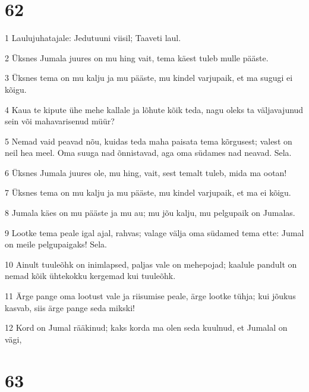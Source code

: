 \chapter{62}

\par 1 Laulujuhatajale: Jedutuuni viisil; Taaveti laul.
\par 2 Üksnes Jumala juures on mu hing vait, tema käest tuleb mulle pääste.
\par 3 Üksnes tema on mu kalju ja mu pääste, mu kindel varjupaik, et ma sugugi ei kõigu.
\par 4 Kaua te kipute ühe mehe kallale ja lõhute kõik teda, nagu oleks ta väljavajunud sein või mahavarisenud müür?
\par 5 Nemad vaid peavad nõu, kuidas teda maha paisata tema kõrgusest; valest on neil hea meel. Oma suuga nad õnnistavad, aga oma südames nad neavad. Sela.
\par 6 Üksnes Jumala juures ole, mu hing, vait, sest temalt tuleb, mida ma ootan!
\par 7 Üksnes tema on mu kalju ja mu pääste, mu kindel varjupaik, et ma ei kõigu.
\par 8 Jumala käes on mu pääste ja mu au; mu jõu kalju, mu pelgupaik on Jumalas.
\par 9 Lootke tema peale igal ajal, rahvas; valage välja oma südamed tema ette: Jumal on meile pelgupaigaks! Sela.
\par 10 Ainult tuuleõhk on inimlapsed, paljas vale on mehepojad; kaalule pandult on nemad kõik ühtekokku kergemad kui tuuleõhk.
\par 11 Ärge pange oma lootust vale ja riisumise peale, ärge lootke tühja; kui jõukus kasvab, siis ärge pange seda mikski!
\par 12 Kord on Jumal rääkinud; kaks korda ma olen seda kuulnud, et Jumalal on vägi,

\chapter{63}

